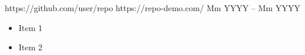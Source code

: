 \documentclass[10pt,a4paper,ragged2e,withhyper]{altacv}
\begin{document}
\begin{paracol}{2}
                 {
                        \cvrepo{\faGithub} %
                        {https://github.com/user/repo} %
                        \cvrepo{\faGlobe} %
                        {https://repo-demo.com/} %
                 }
                 {Mm YYYY -- Mm YYYY}%
                 {}
                \begin{itemize}
                    \item {Item 1} %
                    \item {Item 2} %
                \end{itemize}
                \divider
                 {
                        \cvrepo{\faGitlab} %
}
\end{paracol}
\end{document}
